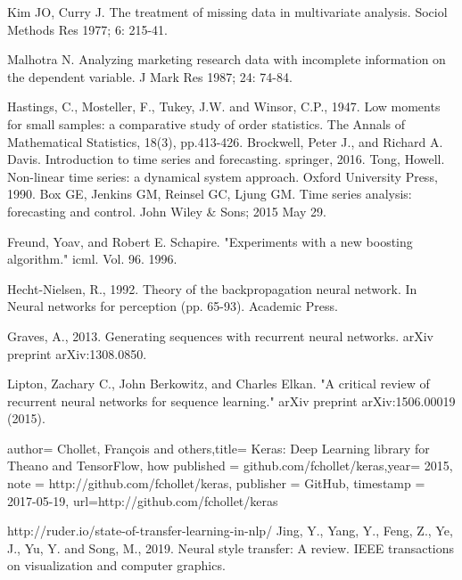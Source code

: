 \documentclass[11pt]{report}           %
\begin{document}
\begin{thebibliography}{80}
Kim JO, Curry J. The treatment of missing data in multivariate
analysis. Sociol Methods Res 1977; 6: 215-41.

 Malhotra N. Analyzing marketing research data with incomplete information on the dependent variable. J Mark Res 1987; 24: 74-84.
 
 Hastings, C., Mosteller, F., Tukey, J.W. and Winsor, C.P., 1947. Low moments for small samples: a comparative study of order statistics. The Annals of Mathematical Statistics, 18(3), pp.413-426.
 Brockwell, Peter J., and Richard A. Davis. Introduction to time series and forecasting. springer, 2016.
 Tong, Howell. Non-linear time series: a dynamical system approach. Oxford University Press, 1990.
 Box GE, Jenkins GM, Reinsel GC, Ljung GM. Time series analysis: forecasting and control. John Wiley & Sons; 2015 May 29.
 
 Freund, Yoav, and Robert E. Schapire. "Experiments with a new boosting algorithm." icml. Vol. 96. 1996.
 
 Hecht-Nielsen, R., 1992. Theory of the backpropagation neural network. In Neural networks for perception (pp. 65-93). Academic Press.
 
 Graves, A., 2013. Generating sequences with recurrent neural networks. arXiv preprint arXiv:1308.0850.
 
 Lipton, Zachary C., John Berkowitz, and Charles Elkan. "A critical review of recurrent neural networks for sequence learning." arXiv preprint arXiv:1506.00019 (2015).
 
  author= {Chollet, Fran\c{c}ois and others},title= {Keras: Deep Learning library for {T}heano and {T}ensorFlow}, how published = {github.com/fchollet/keras},year= {2015}, note = {http://github.com/fchollet/keras},
  publisher    = {GitHub}, timestamp    = {2017-05-19}, url={http://github.com/fchollet/keras}
  
  http://ruder.io/state-of-transfer-learning-in-nlp/
  Jing, Y., Yang, Y., Feng, Z., Ye, J., Yu, Y. and Song, M., 2019. Neural style transfer: A review. IEEE transactions on visualization and computer graphics.
  
\end{thebibliography}
\end{document}
